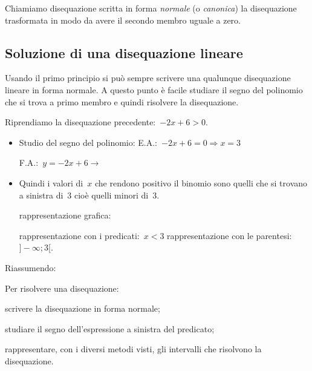 Chiamiamo disequazione scritta in forma \emph{normale} (o \emph{canonica})
la disequazione trasformata in modo da avere il secondo membro uguale a zero.

\subsection{Soluzione di una disequazione lineare}

Usando il primo principio si può sempre scrivere una qualunque disequazione 
lineare in forma normale. A questo punto è facile studiare il segno del 
polinomio che si trova a primo membro e quindi risolvere la disequazione.

\begin{exrig}
 \begin{esempio}
Riprendiamo la disequazione precedente:~$-2 x +6 > 0$.
\begin{itemize}
 \item Studio del segno del polinomio:
 \subitem E.A.:~$-2 x +6=0 \Rightarrow  x=3$
 \subitem
  \begin{minipage}{.25\textwidth}
   F.A.:~$y=-2 x +6 \rightarrow $
  \end{minipage}
  \begin{minipage}{.30\textwidth}
  
  \end{minipage}
 \item Quindi i valori di~$x$ che rendono positivo il binomio sono quelli che si 
  trovano a sinistra di~3 cioè quelli minori di~3. 
 \subitem 
  \begin{minipage}{.35\textwidth}
   rappresentazione grafica: 
  \end{minipage}
  \begin{minipage}{.30\textwidth}
   
  \end{minipage}
 \subitem rappresentazione con i predicati:~$x < 3$ 
 \subitem rappresentazione con le parentesi:~$]-∞; 3[$. 
\end{itemize}
 \end{esempio}
\end{exrig}

Riassumendo:

\begin{procedura}
 Per risolvere una disequazione:
\begin{enumeratea}
 \item scrivere la disequazione in forma normale;
 \item studiare il segno dell'espressione a sinistra del predicato;
 \item rappresentare, con i diversi metodi visti, 
  gli intervalli che risolvono la disequazione.
\end{enumeratea}
\end{procedura}


